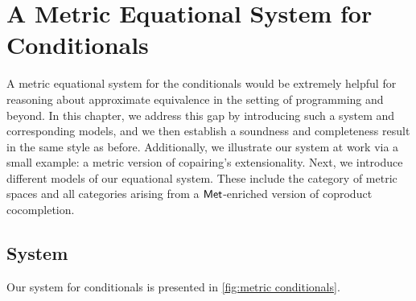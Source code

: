 \chapter{A Metric Equational System for Conditionals} \label{ch:conditionals}

A metric equational system for the conditionals would be extremely helpful for reasoning about approximate equivalence in the setting of programming and beyond.
In this chapter, we address this gap by introducing such a system and corresponding models, and we then establish a soundness and completeness result in the same style as before. Additionally, we illustrate our system at work via a small example: a metric version of copairing's extensionality. 
Next, we introduce different models of our equational system. These include the category of metric spaces and all categories arising from a $\mathsf{Met}$-enriched version of coproduct cocompletion. %






\section{System}

Our system for conditionals is presented in \autoref{fig:metric conditionals}. 


